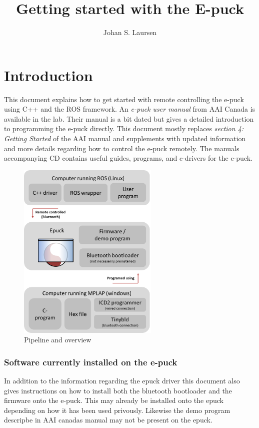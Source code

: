 \documentclass{article}
\begin{document}
\title{Getting started with the E-puck}
\author{Johan S. Laursen}

\maketitle
\tableofcontents

\section{Introduction}
This document explains how to get started with remote controlling the e-puck using C++ and the ROS framework. An \textit{e-puck user manual} from AAI Canada is available in the lab. Their manual is a bit dated but gives a detailed introduction to programming the e-puck directly. This document mostly replaces \textit{section 4: Getting Started} of the AAI manual and supplements with updated information and more details regarding how to control the e-puck remotely. The manuals accompanying CD contains useful guides, programs, and c-drivers for the e-puck.

\begin{figure}[h]
\centering
\includegraphics[width=0.6\textwidth]{pipeline}
\caption{Pipeline and overview}
\label{fig:graphexample}
\end{figure}

\subsubsection*{Software currently installed on the e-puck}
In addition to the information regarding the epuck driver this document also gives instructions on how to install both the bluetooth bootloader and the firmware onto the e-puck. This may already be installed onto the epuck depending on how it has been used privously. Likewise the demo program descripbe in AAI canadas manual may not be present on the epuck.
\end{document}
